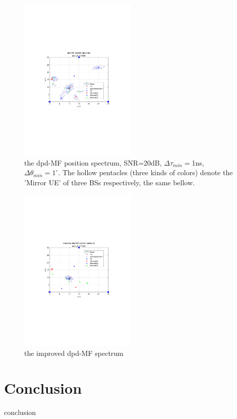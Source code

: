 \documentclass[journal]{IEEEtran}
\begin{document}
\begin{figure}[t]
  \centerline{\includegraphics[width=0.5\textwidth]{figures/dpd-MFspectrum.pdf}}
  \centering
\caption{the dpd-MF position spectrum, SNR=20dB, $\Delta\tau_{min}=$1ns, $\Delta\theta_{min}=1^\circ$. The hollow pentacles (three kinds of colors) denote the 'Mirror UE' of three BSs respectively, the same bellow.}\label{dpd-MFspectrum}
\end{figure}

\begin{figure}[t]
  \centerline{\includegraphics[width=0.5\textwidth]{figures/IprVdpd-MFspectrum.pdf}}
  \centering
\caption{the improved dpd-MF spectrum}\label{IprVdpd-MFspectrum}
\end{figure}

\section{Conclusion}
\label{sec:conclusion}
conclusion
\end{document}
